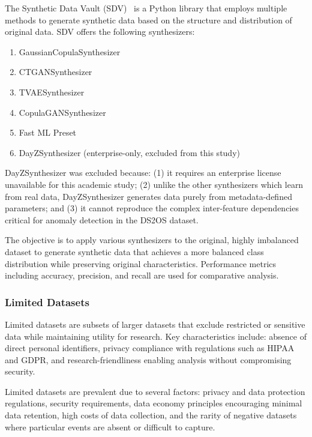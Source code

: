 \documentclass[conference]{IEEEtran}
\begin{document}
The Synthetic Data Vault (SDV)~\cite{sdvdocs} is a Python library that employs multiple methods to generate synthetic data based on the structure and distribution of original data. SDV offers the following synthesizers:
\begin{enumerate}
    \item GaussianCopulaSynthesizer
    \item CTGANSynthesizer
    \item TVAESynthesizer
    \item CopulaGANSynthesizer
    \item Fast ML Preset
    \item DayZSynthesizer (enterprise-only, excluded from this study)
\end{enumerate}

DayZSynthesizer was excluded because: (1) it requires an enterprise license unavailable for this academic study; (2) unlike the other synthesizers which learn from real data, DayZSynthesizer generates data purely from metadata-defined parameters; and (3) it cannot reproduce the complex inter-feature dependencies critical for anomaly detection in the DS2OS dataset.

The objective is to apply various synthesizers to the original, highly imbalanced dataset to generate synthetic data that achieves a more balanced class distribution while preserving original characteristics. Performance metrics including accuracy, precision, and recall are used for comparative analysis.

\subsubsection{Limited Datasets}
Limited datasets are subsets of larger datasets that exclude restricted or sensitive data while maintaining utility for research. Key characteristics include: absence of direct personal identifiers, privacy compliance with regulations such as HIPAA and GDPR, and research-friendliness enabling analysis without compromising security.

Limited datasets are prevalent due to several factors: privacy and data protection regulations, security requirements, data economy principles encouraging minimal data retention, high costs of data collection, and the rarity of negative datasets where particular events are absent or difficult to capture.

\end{document}

